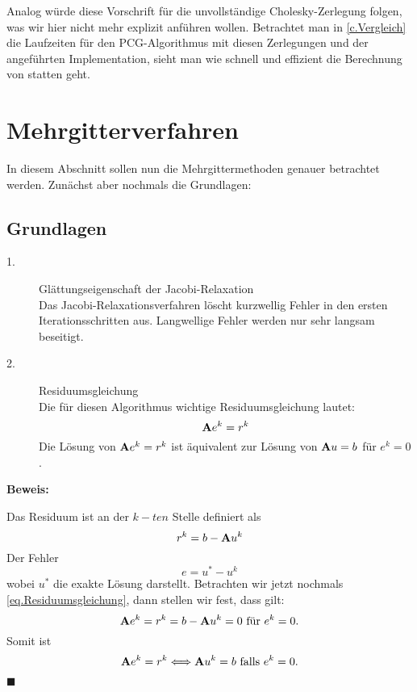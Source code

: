 Analog würde diese Vorschrift für die unvollständige Cholesky-Zerlegung folgen, was wir hier nicht mehr explizit anführen wollen. Betrachtet man in \autoref{c.Vergleich} die Laufzeiten für den PCG-Algorithmus mit diesen Zerlegungen und der angeführten Implementation, sieht man wie schnell und effizient die Berechnung von statten geht.

\chapter{Mehrgitterverfahren}\label{c.Mehrgitterverfahren}

In diesem Abschnitt sollen nun die Mehrgittermethoden genauer betrachtet werden. Zunächst aber nochmals die Grundlagen:

\section{Grundlagen}\label{s.Idee MGM}

\begin{description}

\item[1.] Glättungseigenschaft der Jacobi-Relaxation \\
Das Jacobi-Relaxationsverfahren löscht kurzwellig Fehler in den ersten Iterationsschritten aus. Langwellige Fehler werden nur sehr langsam beseitigt.
\item[2.] Residuumsgleichung \\
Die für diesen Algorithmus wichtige Residuumsgleichung lautet:
\begin{equation}
{\textbf{A}} e^{k} = r^{k}\label{eq.Residuumsgleichung}
\end{equation}
Die Lösung von ${\textbf{A}} e^{k} = r^{k}$ ist äquivalent zur Lösung von ${\textbf{A}}u=b$ für $e^{k} = 0$.

\end{description}

\textbf{Beweis:}

Das Residuum ist an der $k-ten$ Stelle definiert als 
\begin{equation}
r^{k} = b - {\textbf{A}}u^{k}
\end{equation}
Der Fehler
\begin{equation}
e = u^{*} - u^{k}\label{eq.Fehler}
\end{equation}
wobei $u^{*}$ die exakte Lösung darstellt.
Betrachten wir jetzt nochmals \autoref{eq.Residuumsgleichung}, dann stellen wir fest, dass gilt:
\begin{equation}
{\textbf{A}}e^{k} = r^{k} = b - {\textbf{A}}u^{k} = 0 \textnormal{ für } e^{k} = 0.
\end{equation}
Somit ist
\begin{equation}
{\textbf{A}}e^{k} = r^{k} \Longleftrightarrow {\textbf{A}}u^{k} = b \textnormal{ falls } e^{k} = 0.
\end{equation}
\begin{flushright}
$\blacksquare$
\end{flushright}

